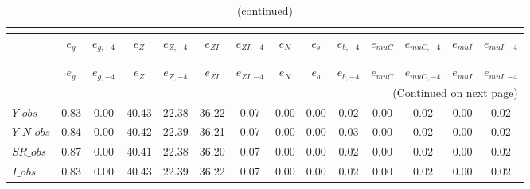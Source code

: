  
\begin{center}
\begin{longtable}{lccccccccccccc} 
\caption{VARIANCE DECOMPOSITION (in percent)}\\
 \label{Table:th_var_decomp_uncond}\\
\toprule 
$               $	 & 	 $           {e_g}$	 & 	 $      {e_{g,-4}}$	 & 	 $           {e_Z}$	 & 	 $      {e_{Z,-4}}$	 & 	 $        {e_{ZI}}$	 & 	 $     {e_{ZI,-4}}$	 & 	 $           {e_N}$	 & 	 $           {e_b}$	 & 	 $      {e_{b,-4}}$	 & 	 $       {e_{muC}}$	 & 	 $    {e_{muC,-4}}$	 & 	 $       {e_{muI}}$	 & 	 $    {e_{muI,-4}}$\\
\midrule \endfirsthead 
\caption{(continued)}\\
 \toprule \\ 
$               $	 & 	 $           {e_g}$	 & 	 $      {e_{g,-4}}$	 & 	 $           {e_Z}$	 & 	 $      {e_{Z,-4}}$	 & 	 $        {e_{ZI}}$	 & 	 $     {e_{ZI,-4}}$	 & 	 $           {e_N}$	 & 	 $           {e_b}$	 & 	 $      {e_{b,-4}}$	 & 	 $       {e_{muC}}$	 & 	 $    {e_{muC,-4}}$	 & 	 $       {e_{muI}}$	 & 	 $    {e_{muI,-4}}$\\
\midrule \endhead 
\midrule \multicolumn{14}{r}{(Continued on next page)} \\ \bottomrule \endfoot 
\bottomrule \endlastfoot 
$Y\_obs         $	 & 	            0.83	 & 	            0.00	 & 	           40.43	 & 	           22.38	 & 	           36.22	 & 	            0.07	 & 	            0.00	 & 	            0.00	 & 	            0.02	 & 	            0.00	 & 	            0.02	 & 	            0.00	 & 	            0.02 \\ 
$Y\_N\_obs      $	 & 	            0.84	 & 	            0.00	 & 	           40.42	 & 	           22.39	 & 	           36.21	 & 	            0.07	 & 	            0.00	 & 	            0.00	 & 	            0.03	 & 	            0.00	 & 	            0.02	 & 	            0.00	 & 	            0.02 \\ 
$SR\_obs        $	 & 	            0.87	 & 	            0.00	 & 	           40.41	 & 	           22.38	 & 	           36.20	 & 	            0.07	 & 	            0.00	 & 	            0.00	 & 	            0.02	 & 	            0.00	 & 	            0.02	 & 	            0.00	 & 	            0.02 \\ 
$I\_obs         $	 & 	            0.83	 & 	            0.00	 & 	           40.43	 & 	           22.39	 & 	           36.22	 & 	            0.07	 & 	            0.00	 & 	            0.00	 & 	            0.02	 & 	            0.00	 & 	            0.02	 & 	            0.00	 & 	            0.02 \\ 

\end{longtable}
\end{center}
